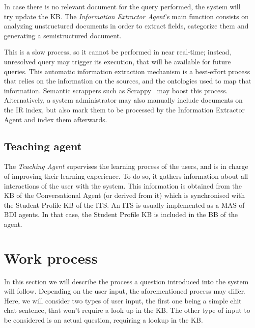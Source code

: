In case there is no relevant document for the query performed, the system will try update the KB. The {\em Information Extractor Agent}'s main function consists on analyzing unstructured documents in order to extract fields, categorize them and generating a semistructured document. 

This is a slow process, so it cannot be performed in near real-time; instead, unresolved query may trigger its execution, that will be available for future queries. 
This automatic information extraction mechanism is a best-effort process that relies on the information on the sources, and the ontologies used to map that information. Semantic scrappers such as Scrappy~\cite{villamor13} may boost this process.
Alternatively, a system administrator may also manually include documents on the \ac{IR} index, but also mark them to be processed by the Information Extractor Agent and index them afterwards.

\subsection{Teaching agent}

The {\em Teaching Agent} supervises the learning process of the users, and is in charge of improving their learning experience.
To do so, it  gathers information about all interactions of the user with the system. This information is obtained from the \ac{KB} of the Conversational Agent (or derived from it) which is synchronised with the Student Profile KB of the \ac{ITS}.
An \ac{ITS} is usually implemented as a \ac{MAS} of \ac{BDI} agents. In that case, the Student Profile KB is included in the \ac{BB} of the agent. 

%
\section{Work process} %

In this section we will describe the process a question introduced into the system will follow. Depending on the user input, the aforementioned process may differ. Here, we will consider two types of user input, the first one being a simple chit chat sentence, that won't require a look up in the \ac{KB}. The other type of input to be considered is an actual question, requiring a lookup in the \ac{KB}.

